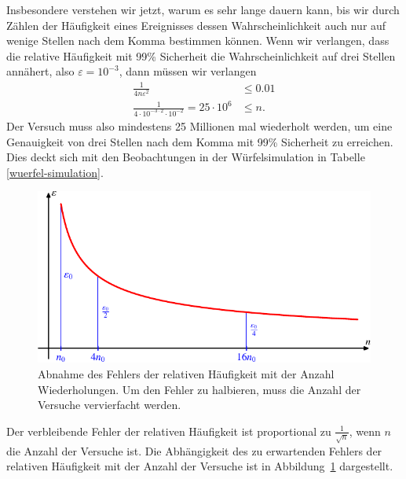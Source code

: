 Insbesondere verstehen wir jetzt, warum es sehr lange dauern kann, bis
wir durch Zählen der Häufigkeit eines Ereignisses dessen Wahrscheinlichkeit
auch nur auf wenige Stellen nach dem Komma bestimmen können.
Wenn wir verlangen, dass die relative Häufigkeit mit
99\% Sicherheit die Wahrscheinlichkeit auf drei Stellen annähert, also
$\varepsilon=10^{-3}$, dann müssen wir verlangen
\begin{align*}
\frac{1}{4n\varepsilon^2}&\le 0.01\\
\frac1{4\cdot 10^{-3\cdot 2}\cdot10^{-2}}=25\cdot 10^6&\le n.
\end{align*}
Der Versuch muss also mindestens 25 Millionen mal wiederholt werden,
um eine Genauigkeit von drei Stellen nach dem Komma mit 99\% Sicherheit
zu erreichen.
Dies deckt sich mit den Beobachtungen in der Würfelsimulation
in Tabelle
\ref{wuerfel-simulation}.
\begin{figure}
\centering
\includegraphics{images/erwartung-7.pdf}
\caption{Abnahme des Fehlers der relativen Häufigkeit mit der Anzahl
Wiederholungen.
Um den Fehler zu halbieren, muss die Anzahl der Versuche
vervierfacht werden.
\label{fehlerabnahme}}
\end{figure}
Der verbleibende Fehler der relativen Häufigkeit ist proportional zu
$\frac1{\sqrt{n}}$, wenn $n$ die Anzahl der Versuche ist.
Die Abhängigkeit des zu erwartenden Fehlers der relativen Häufigkeit mit
der Anzahl der Versuche ist in Abbildung~\ref{fehlerabnahme} dargestellt.



